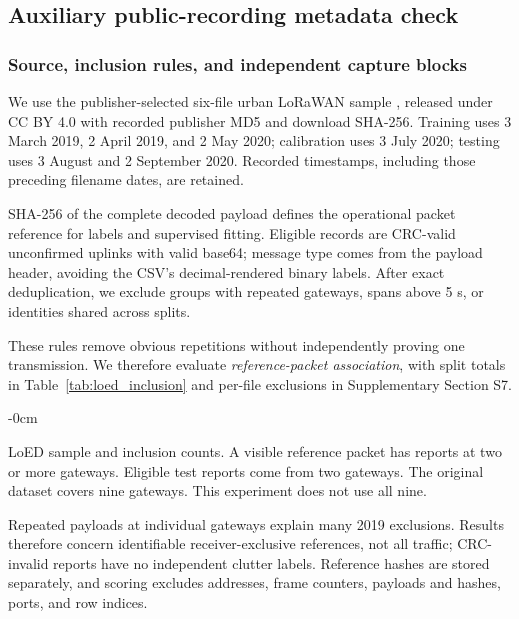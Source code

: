 \subsection{Auxiliary public-recording metadata check}\label{sec:public_data}
\subsubsection{Source, inclusion rules, and independent capture blocks}
We use the publisher-selected six-file urban LoRaWAN sample \cite{loed2020,loeddataset}, released under CC BY 4.0 with recorded publisher MD5 and download SHA-256. Training uses 3 March 2019, 2 April 2019, and 2 May 2020; calibration uses 3 July 2020; testing uses 3 August and 2 September 2020. Recorded timestamps, including those preceding filename dates, are retained.

SHA-256 of the complete decoded payload defines the operational packet reference for labels and supervised fitting. Eligible records are CRC-valid unconfirmed uplinks with valid base64; message type comes from the payload header, avoiding the CSV's decimal-rendered binary labels. After exact deduplication, we exclude groups with repeated gateways, spans above 5 s, or identities shared across splits.

These rules remove obvious repetitions without independently proving one transmission. We therefore evaluate \emph{reference-packet association}, with split totals in Table~\ref{tab:loed_inclusion} and per-file exclusions in Supplementary Section S7.

\begin{table}[!t]\begin{adjustwidth}{-\extralength}{0cm}
\caption{LoED sample and inclusion counts. A visible reference packet has reports at two or more gateways. Eligible test reports come from two gateways. The original dataset covers nine gateways. This experiment does not use all nine.}\label{tab:loed_inclusion}
\small\renewcommand{\arraystretch}{1.12}
\end{adjustwidth}\end{table}

Repeated payloads at individual gateways explain many 2019 exclusions. Results therefore concern identifiable receiver-exclusive references, not all traffic; CRC-invalid reports have no independent clutter labels. Reference hashes are stored separately, and scoring excludes addresses, frame counters, payloads and hashes, ports, and row indices.

